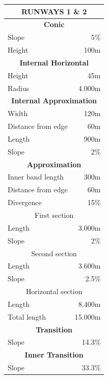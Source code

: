 	\begin{longtable}[htb]{@{}lr@{}}
		\toprule[3pt]
		\multicolumn{2}{c}{\textbf{\large RUNWAYS 1 \& 2  } }\\ \midrule[2pt]
		\multicolumn{2}{c}{\textbf{Conic} }\\
		\midrule[0.5pt]
		Slope & 5\%\\
		Height & 100m\\
		\midrule[2pt]
		\multicolumn{2}{c}{\textbf{Internal Horizontal} }\\
		\midrule[0.5pt]
		Height & 45m\\
		Radius & 4.000m\\
		\midrule[2pt]
		\multicolumn{2}{c}{\textbf{Internal Approximation} }\\
		\midrule[0.5pt]
		Width & 120m\\
		Distance from edge & 60m\\
		Length & 900m\\
		Slope & 2\% \\
		\midrule[2pt]
		\multicolumn{2}{c}{\textbf{Approximation} }\\
		\midrule[0.5pt]
		Inner band length & 300m\\
		Distance from edge & 60m\\
		Divergence & 15\% \\
		\midrule[0.5pt]
		\multicolumn{2}{c}{First section} \\
		\midrule[0.5pt]
		Length & 3.000m\\
		Slope & 2\%\\
		\midrule[0.5pt]
		\multicolumn{2}{c}{Second section} \\
		\midrule[0.5pt]
		Length & 3.600m\\
		Slope & 2.5\%\\
		\midrule[0.5pt]
		\multicolumn{2}{c}{Horizontal section} \\
		\midrule[0.5pt]
		Length & 8.400m\\
		Total length & 15.000m\\
		\midrule[2pt]
		\multicolumn{2}{c}{\textbf{Transition} }\\
		\midrule[0.5pt]
		Slope & 14.3\%\\
		\midrule[2pt]
		\multicolumn{2}{c}{\textbf{Inner Transition} }\\
		\midrule[0.5pt]
		Slope & 33.3\%\\
		\midrule[2pt]
		

\end{longtable}
